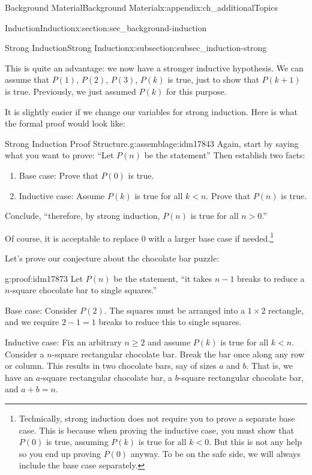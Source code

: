 \documentclass[oneside,10pt,]{book}
\numberwithin{equation}{chapter}
\newcommand{\lt}{<}
\newcommand{\gt}{>}
\begin{document}
\begin{appendixptx}{Background Material}{}{Background Material}{}{}{x:appendix:ch_additionalTopics}
\begin{sectionptx}{Induction}{}{Induction}{}{}{x:section:sec_background-induction}
\begin{subsectionptx}{Strong Induction}{}{Strong Induction}{}{}{x:subsection:subsec_induction-strong}
\par
This is quite an advantage: we now have a stronger inductive hypothesis. We can assume that \(P(1)\), \(P(2)\), \(P(3)\), \textellipsis{} \(P(k)\) is true, just to show that \(P(k+1)\) is true. Previously, we just assumed \(P(k)\) for this purpose.%
\par
It is slightly easier if we change our variables for strong induction. Here is what the formal proof would look like:%
\begin{assemblage}{Strong Induction Proof Structure.}{g:assemblage:idm17843}%
Again, start by saying what you want to prove: ``Let \(P(n)\) be the statement\textellipsis{}'' Then establish two facts:%
\begin{enumerate}
\item{}Base case: Prove that \(P(0)\) is true.%
\item{}Inductive case: Assume \(P(k)\) is true for all \(k \lt  n\). Prove that \(P(n)\) is true.%
\end{enumerate}
Conclude, ``therefore, by strong induction, \(P(n)\) is true for all \(n \gt 0\).''%
\end{assemblage}
Of course, it is acceptable to replace 0 with a larger base case if needed.\footnote{Technically, strong induction does not require you to prove a separate base case. This is because when proving the inductive case, you must show that \(P(0)\) is true, assuming \(P(k)\) is true for all \(k \lt  0\). But this is not any help so you end up proving \(P(0)\) anyway. To be on the safe side, we will always include the base case separately.\label{g:fn:idm17867}}%
\par
Let's prove our conjecture about the chocolate bar puzzle:%
\begin{proofptx}{}{g:proof:idm17873}
Let \(P(n)\) be the statement, ``it takes \(n-1\) breaks to reduce a \(n\)-square chocolate bar to single squares.''%
\par
Base case: Consider \(P(2)\). The squares must be arranged into a \(1\times 2\) rectangle, and we require \(2-1 = 1\) breaks to reduce this to single squares.%
\par
Inductive case: Fix an arbitrary \(n\ge 2\) and assume \(P(k)\) is true for all \(k \lt n\).  Consider a \(n\)-square rectangular chocolate bar.  Break the bar once along any row or column.  This results in two chocolate bars, say of sizes \(a\) and \(b\).  That is, we have an \(a\)-square rectangular chocolate bar, a \(b\)-square rectangular chocolate bar, and \(a+b = n\).%
\par

\end{proofptx}
\end{subsectionptx}
\end{sectionptx}
\end{appendixptx}
\end{document}
